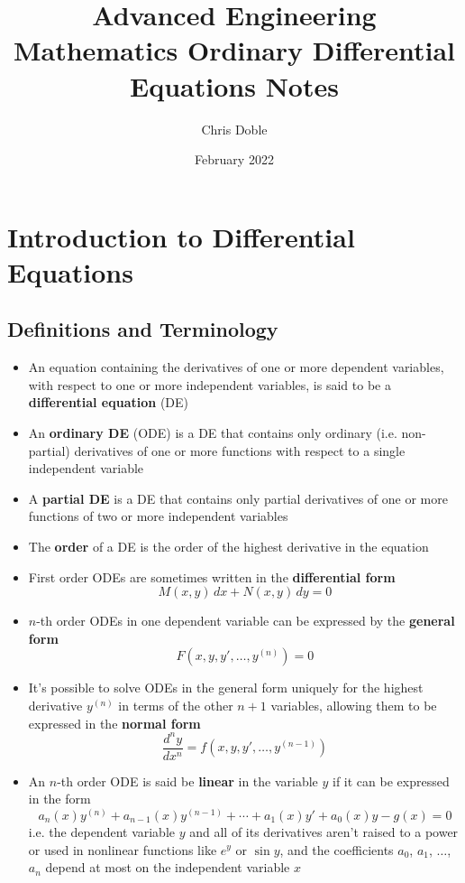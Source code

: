\documentclass{article}
\title{Advanced Engineering Mathematics Ordinary Differential Equations Notes}
\author{Chris Doble}
\date{February 2022}
\begin{document}
\maketitle

\tableofcontents

\section{Introduction to Differential Equations}

\subsection{Definitions and Terminology}

\begin{itemize}
  \item An equation containing the derivatives of one or more dependent variables, with respect to one or more independent variables, is said to be a \textbf{differential equation} (DE)

  \item An \textbf{ordinary DE} (ODE) is a DE that contains only ordinary (i.e. non-partial) derivatives of one or more functions with respect to a single independent variable

  \item A \textbf{partial DE} is a DE that contains only partial derivatives of one or more functions of two or more independent variables

  \item The \textbf{order} of a DE is the order of the highest derivative in the equation

  \item First order ODEs are sometimes written in the \textbf{differential form} \[M(x, y) \,dx + N(x, y) \,dy = 0\]

  \item $n$-th order ODEs in one dependent variable can be expressed by the \textbf{general form} \[F(x, y, y', \ldots, y^{(n)}) = 0\]

  \item It's possible to solve ODEs in the general form uniquely for the highest derivative $y^{(n)}$ in terms of the other $n + 1$ variables, allowing them to be expressed in the \textbf{normal form} \[\frac{d^n y}{d x^n} = f(x, y, y', \ldots, y^{(n - 1)})\]

  \item An $n$-th order ODE is said be \textbf{linear} in the variable $y$ if it can be expressed in the form \[a_n(x) y^{(n)} + a_{n-1}(x) y^{(n - 1)} + \cdots + a_1(x) y' + a_0(x) y - g(x) = 0\] i.e. the dependent variable $y$ and all of its derivatives aren't raised to a power or used in nonlinear functions like $e^y$ or $\sin y$, and the coefficients $a_0$, $a_1$, $\ldots$, $a_n$ depend at most on the independent variable $x$


\end{itemize}
\end{document}
